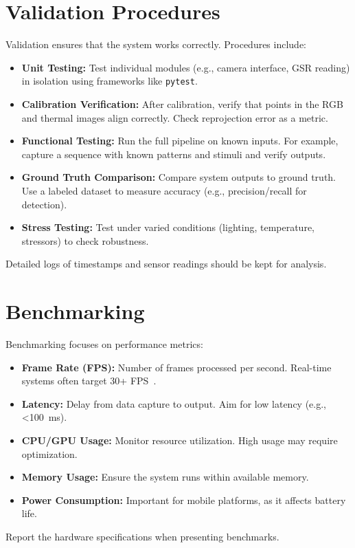\documentclass{article}
\begin{document}
    \section{Validation Procedures}

    Validation ensures that the system works correctly. Procedures include:
    \begin{itemize}
        \item \textbf{Unit Testing:} Test individual modules (e.g., camera interface, GSR reading) in isolation using frameworks like \texttt{pytest}.
        \item \textbf{Calibration Verification:} After calibration, verify that points in the RGB and thermal images align correctly. Check reprojection error as a metric.
        \item \textbf{Functional Testing:} Run the full pipeline on known inputs. For example, capture a sequence with known patterns and stimuli and verify outputs.
        \item \textbf{Ground Truth Comparison:} Compare system outputs to ground truth. Use a labeled dataset to measure accuracy (e.g., precision/recall for detection).
        \item \textbf{Stress Testing:} Test under varied conditions (lighting, temperature, stressors) to check robustness.
    \end{itemize}
    Detailed logs of timestamps and sensor readings should be kept for analysis.


    \section{Benchmarking}

    Benchmarking focuses on performance metrics:
    \begin{itemize}
        \item \textbf{Frame Rate (FPS):} Number of frames processed per second. Real-time systems often target 30+ FPS~\cite{RefFPS}.
        \item \textbf{Latency:} Delay from data capture to output. Aim for low latency (e.g., <100~ms).
        \item \textbf{CPU/GPU Usage:} Monitor resource utilization. High usage may require optimization.
        \item \textbf{Memory Usage:} Ensure the system runs within available memory.
        \item \textbf{Power Consumption:} Important for mobile platforms, as it affects battery life.
    \end{itemize}
    Report the hardware specifications when presenting benchmarks.
\end{document}
